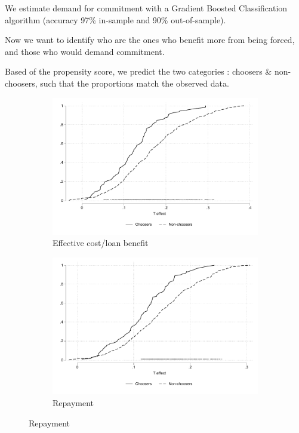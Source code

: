 \documentclass[oneside,11pt]{article}
\begin{document}
We estimate demand for commitment with a Gradient Boosted Classification algorithm (accuracy 97\% in-sample and 90\% out-of-sample).


Now we want to identify who are the ones who benefit more from being forced, and those who would demand commitment.



Based of the propensity score, we predict the two categories : choosers \& non-choosers, such that the proportions match the observed data.

\begin{figure}[H]
    \caption{Negative selection on treatment effects}
    \label{benefit_vs_choice_cdf}
    \begin{center}
    \begin{subfigure}{0.475\textwidth}
        \caption{Effective cost/loan benefit}
        \centering
        \includegraphics[width=\textwidth]{Figuras/cdf_predchoose_tau_eff.pdf}
    \end{subfigure}
    \begin{subfigure}{0.475\textwidth}
        \caption{Repayment}
        \centering
        \includegraphics[width=\textwidth]{Figuras/cdf_predchoose_tau_des.pdf}
    \end{subfigure}
  

\end{center}
\end{figure}
\end{document}
